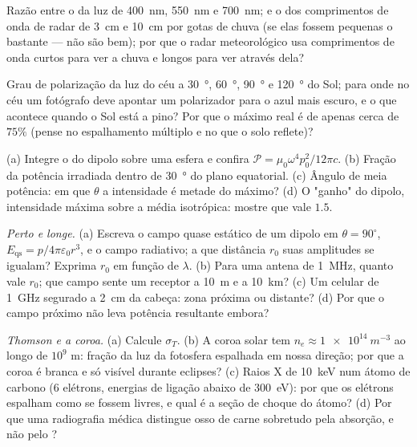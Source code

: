 \begin{exercise}[$\star$]\label{exo:b2:dipole-radiation:3}
Razão entre o  da luz de \qty{400}{nm}, \qty{550}{nm} e
\qty{700}{nm}; e o dos comprimentos de onda de radar de \qty{3}{cm} e \qty{10}{cm} por
gotas de chuva (se elas fossem pequenas o bastante --- não são bem); por que
o radar meteorológico usa comprimentos de onda curtos para ver a chuva e longos para ver
através dela?
\end{exercise}

\begin{exercise}[$\star$]\label{exo:b2:dipole-radiation:4}
Grau de polarização da luz do céu a \qty{30}{\degree}, \qty{60}{\degree},
\qty{90}{\degree} e \qty{120}{\degree} do Sol; para onde no céu um
fotógrafo deve apontar um polarizador para o azul mais escuro, e o que
acontece quando o Sol está a pino? Por que o máximo real é de apenas cerca de
$75\%$ (pense no espalhamento múltiplo e no que o solo reflete)?
\end{exercise}

\begin{exercise}[$\star\star$]\label{exo:b2:dipole-radiation:5}
(a) Integre o  do dipolo sobre uma esfera e
confira $\mathcal P = \mu_0\omega^4p_0^2/12\pi c$. (b) Fração da potência
irradiada dentro de \qty{30}{\degree} do plano equatorial. (c) Ângulo de
meia potência: em que $\theta$ a intensidade é metade do máximo? (d) O
"ganho" do dipolo, intensidade máxima sobre a média isotrópica:
mostre que vale $1.5$.
\end{exercise}

\begin{exercise}[$\star\star$]\label{exo:b2:dipole-radiation:6}
\emph{Perto e longe.} (a) Escreva o campo quase estático de um dipolo em
$\theta = 90^\circ$, $E_{\text{qs}} = p/4\pi\varepsilon_0r^3$, e o campo radiativo; a
que distância $r_0$ suas amplitudes se igualam? Exprima $r_0$ em função de
$\lambda$. (b) Para uma antena de \qty{1}{MHz}, quanto vale $r_0$; que campo sente um receptor
a \qty{10}{m} e a \qty{10}{km}? (c) Um celular de \qty{1}{GHz} segurado
a \qty{2}{cm} da cabeça: zona próxima ou distante? (d) Por que o campo próximo
não leva potência resultante embora?
\end{exercise}

\begin{exercise}[$\star\star$]\label{exo:b2:dipole-radiation:7}
\emph{Thomson e a coroa.} (a) Calcule $\sigma_T$. (b) A coroa solar
tem $n_e \approx \qty{1e14}{m^{-3}}$ ao longo de $10^9$ m: fração da luz
da fotosfera espalhada em nossa direção; por que a coroa é branca e só visível
durante eclipses? (c) Raios X de \qty{10}{keV} num átomo de carbono ($6$
elétrons, energias de ligação abaixo de \qty{300}{eV}): por que os elétrons
espalham como se fossem livres, e qual é a seção de choque do átomo? (d) Por que
uma radiografia médica distingue osso de carne sobretudo pela
absorção, e não pelo ?
\end{exercise}

